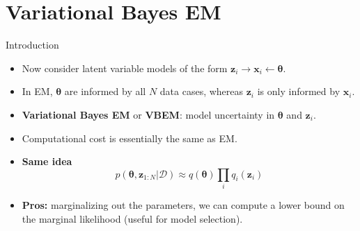\documentclass[10pt,mathserif]{beamer}
\begin{document}
\section{Variational Bayes EM}
\begin{frame}{Introduction}
\begin{itemize}
    \item Now consider latent variable models of the form $\bm{z}_i \rightarrow \bm{x}_i \leftarrow \bm{\theta}$.
    \item In EM, $\bm{\theta}$ are informed by all $N$ data cases, whereas $\bm{z}_i$ is only informed by $\bm{x}_i$.
    \item \textbf{Variational Bayes EM} or \textbf{VBEM}: model uncertainty in $\bm{\theta}$ and $\bm{z}_i$.
    \item Computational cost is essentially the same as EM.
    \item \textbf{Same idea}
    \begin{equation}
        p(\bm{\theta}, \bm{z}_{1:N}|\mathcal{D}) \approx q (\bm{\theta})\prod_i q_i(\bm{z}_i)
    \end{equation}
    \item \textbf{Pros:} marginalizing out the parameters, we can compute a lower bound on the marginal likelihood (useful for model selection).
\end{itemize} 
\end{frame}
\end{document}
